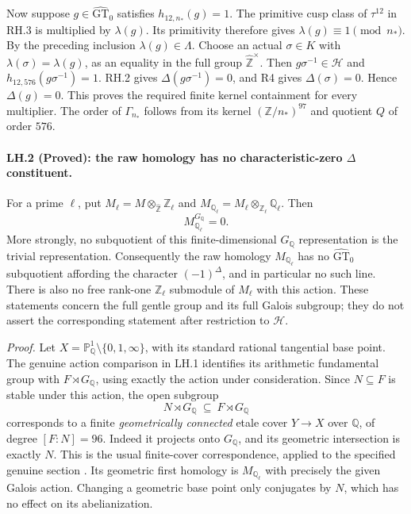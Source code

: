 Now suppose $g\in\widehat{\mathrm{GT}}_0$ satisfies
$h_{12,n_*}(g)=1$. The primitive cusp class of $\tau^{12}$
in RH.3 is multiplied by $\lambda(g)$. Its primitivity
therefore gives $\lambda(g)\equiv1\pmod{n_*}$.
By the preceding inclusion $\lambda(g)\in\Lambda$.
Choose an actual $\sigma\in K$ with
$\lambda(\sigma)=\lambda(g)$, as an equality in the full
group $\widehat{\mathbb Z}^{\times}$.
Then $g\sigma^{-1}\in\mathcal H$ and
$h_{12,576}(g\sigma^{-1})=1$.
RH.2 gives $\Delta(g\sigma^{-1})=0$, and R4 gives
$\Delta(\sigma)=0$. Hence $\Delta(g)=0$.
This proves the required finite kernel containment for
every multiplier. The order of $\Gamma_{n_*}$ follows
from its kernel $(\mathbb Z/n_*)^{97}$ and quotient $Q$ of
order $576$.

\paragraph{LH.2 (Proved): the raw homology has no characteristic-zero $\Delta$ constituent.}
For a prime $\ell$, put
$M_\ell=M\otimes_{\widehat{\mathbb Z}}\mathbb Z_\ell$
and $M_{\mathbb Q_\ell}=M_\ell\otimes_{\mathbb Z_\ell}\mathbb Q_\ell$.
Then
\[
                 M_{\mathbb Q_\ell}^{G_{\mathbb Q}}=0.
\]
More strongly, no subquotient of this finite-dimensional
$G_{\mathbb Q}$ representation is the trivial representation.
Consequently the raw homology $M_{\mathbb Q_\ell}$ has no
$\widehat{\mathrm{GT}}_0$ subquotient affording the character
$(-1)^\Delta$, and in particular no such line. There is also
no free rank-one $\mathbb Z_\ell$ submodule of $M_\ell$
with this action. These statements concern the full gentle
group and its full Galois subgroup; they do not assert the
corresponding statement after restriction to $\mathcal H$.

\emph{Proof.}
Let $X=\mathbb P^1_{\mathbb Q}\setminus\{0,1,\infty\}$,
with its standard rational tangential base point. The genuine
action comparison in LH.1 identifies its arithmetic
fundamental group with $F\rtimes G_{\mathbb Q}$, using
exactly the action under consideration. Since $N\subseteq F$
is stable under this action, the open subgroup
\[
                  N\rtimes G_{\mathbb Q}
                  \ \subseteq\ F\rtimes G_{\mathbb Q}
\]
corresponds to a finite \emph{geometrically connected} etale
cover $Y\to X$ over $\mathbb Q$, of degree $[F:N]=96$.
Indeed it projects onto $G_{\mathbb Q}$, and its geometric
intersection is exactly $N$. This is the usual finite-cover
correspondence, applied to the specified genuine section
\cite[\S3]{LiftMilneLEC2013}. Its geometric first homology
is $M_{\mathbb Q_\ell}$ with precisely the given Galois
action. Changing a geometric base point only conjugates
by $N$, which has no effect on its abelianization.

